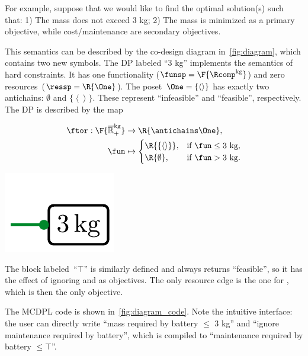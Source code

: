 For example, suppose that we would like to find the optimal solution(s)
such that: 1) The mass does not exceed 3 kg; 2) The mass is minimized
as a primary objective, while cost/maintenance are secondary objectives.

This semantics can be described by the co-design diagram in~\cref{fig:diagram},
which contains two new symbols. The DP labeled ``3 kg'' implements
the semantics of hard constraints. It has one functionality ($\funsp=\F{\Rcomp^{\text{kg}}}$)
and zero resources~($\ressp=\R{\One}$). The poset~$\One=\{\left\langle \right\rangle \}$
has exactly two antichains: $\emptyset$ and $\{\left\langle \right\rangle \}$.
These represent ``infeasible'' and ``feasible'', respectively.
The DP is described by the map

\quad\quad
\begin{minipage}[c]{5cm}
\begin{align*}
\ftor:\F{\mathbb{\overline{R}}_{+}^{\text{kg}}} & \rightarrow\R{\antichains\One},\\
\fun& \mapsto\begin{cases}
\R{\{\left\langle \right\rangle \}}, & \text{if }\fun\leq\text{3 kg},\\
\R{\emptyset}, & \text{if }\fun>\text{3 kg}.
\end{cases}
\end{align*}

\end{minipage}\quad\includegraphics[scale=0.45]{papers/arxiv_submission_v6/batteries_3kg.pdf}

\smallskip{}

\noindent The block labeled~``$\top$'' is similarly defined and
always returns ``feasible'', so it has the effect of ignoring 
and  as objectives. The only resource edge is the
one for , which is then the only objective.

The MCDPL code is shown in~\cref{fig:diagram_code}. Note the intuitive
interface: the user can directly write ``mass required by battery
$\leq$ 3 kg'' and ``ignore maintenance required by battery'',
which is compiled to ``maintenance required by battery $\leq\top$''.

